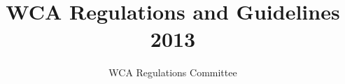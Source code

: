 
\usepackage[top=2cm, bottom=2cm, left=2cm, right=2cm]{geometry}

\usepackage[bookmarksopen=true]{hyperref}

\usepackage{bookmark}
\usepackage{graphicx}

\usepackage{fancyhdr}
\pagestyle{fancy}

\setcounter{secnumdepth}{-1}

\title{WCA Regulations and Guidelines 2013}
\author{WCA Regulations Committee}
\date{\vspace{-1em}}



\maketitle

\tableofcontents

\newpage


